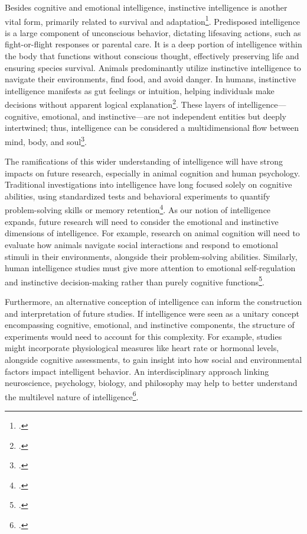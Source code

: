 \documentclass[12pt]{article}
\begin{document}
Besides cognitive and emotional intelligence, instinctive intelligence is another vital form, primarily related to survival and adaptation\footcite{dewaal2016are}. Predisposed intelligence is a large component of unconscious behavior, dictating lifesaving actions, such as fight-or-flight responses or parental care. It is a deep portion of intelligence within the body that functions without conscious thought, effectively preserving life and ensuring species survival. Animals predominantly utilize instinctive intelligence to navigate their environments, find food, and avoid danger. In humans, instinctive intelligence manifests as gut feelings or intuition, helping individuals make decisions without apparent logical explanation\footcite{dewaal2016are}. These layers of intelligence—cognitive, emotional, and instinctive—are not independent entities but deeply intertwined; thus, intelligence can be considered a multidimensional flow between mind, body, and soul\footcite{gardner1999intelligence}.

The ramifications of this wider understanding of intelligence will have strong impacts on future research, especially in animal cognition and human psychology. Traditional investigations into intelligence have long focused solely on cognitive abilities, using standardized tests and behavioral experiments to quantify problem-solving skills or memory retention\footcite{sternberg2004wisdom}. As our notion of intelligence expands, future research will need to consider the emotional and instinctive dimensions of intelligence. For example, research on animal cognition will need to evaluate how animals navigate social interactions and respond to emotional stimuli in their environments, alongside their problem-solving abilities. Similarly, human intelligence studies must give more attention to emotional self-regulation and instinctive decision-making rather than purely cognitive functions\footcite{dewaal2016are}.

Furthermore, an alternative conception of intelligence can inform the construction and interpretation of future studies. If intelligence were seen as a unitary concept encompassing cognitive, emotional, and instinctive components, the structure of experiments would need to account for this complexity. For example, studies might incorporate physiological measures like heart rate or hormonal levels, alongside cognitive assessments, to gain insight into how social and environmental factors impact intelligent behavior. An interdisciplinary approach linking neuroscience, psychology, biology, and philosophy may help to better understand the multilevel nature of intelligence\footcite{goleman1995emotional}.
\end{document}
